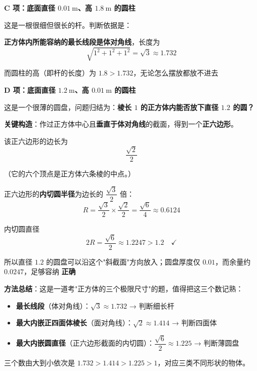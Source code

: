 \par\medskip

\textbf{C 项：底面直径 $0.01\ \mathrm m$、高 $1.8\ \mathrm m$ 的圆柱 }

这是一根很细但很长的杆。判断依据是：

\textbf{正方体内所能容纳的最长线段是体对角线}，长度为
\[\sqrt{1^{2}+1^{2}+1^{2}}=\sqrt3\approx1.732\]

而圆柱的高（即杆的长度）为 $1.8>1.732$，无论怎么摆放都放不进去 

\par\medskip

\textbf{D 项：底面直径 $1.2\ \mathrm m$、高 $0.01\ \mathrm m$ 的圆柱 }

这是一个很薄的圆盘，问题归结为：\textbf{棱长 $1$ 的正方体内能否放下直径 $1.2$ 的圆？}

\textbf{关键构造}：作过正方体中心且\textbf{垂直于体对角线}的截面，得到一个\textbf{正六边形}。

该正六边形的边长为
\[\frac{\sqrt2}2\]

（它的六个顶点是正方体六条棱的中点。）

正六边形的\textbf{内切圆半径}为边长的 $\dfrac{\sqrt3}2$ 倍：
\[R=\frac{\sqrt3}2\times\frac{\sqrt2}2=\frac{\sqrt6}4\approx0.6124\]

内切圆直径
\[2R=\frac{\sqrt6}2\approx1.2247>1.2\quad\checkmark\]

所以直径 $1.2$ 的圆盘可以沿这个"斜截面"方向放入；圆盘厚度仅 $0.01$，而余量约 $0.0247$，足够容纳  \textbf{正确}


\begin{gktip}
\textbf{方法总结}：这是一道考"正方体的三个极限尺寸"的题，值得把这三个数记熟：
\begin{itemize}
\item \textbf{最长线段}（体对角线）：$\sqrt3\approx1.732$ → 判断细长杆
\item \textbf{最大内嵌正四面体棱长}（面对角线）：$\sqrt2\approx1.414$ → 判断四面体
\item \textbf{最大内嵌圆直径}（正六边形截面的内切圆）：$\dfrac{\sqrt6}2\approx1.225$ → 判断薄圆盘
\end{itemize}

三个数由大到小依次是 $1.732>1.414>1.225>1$，对应三类不同形状的物体。
\end{gktip}

\par\medskip


